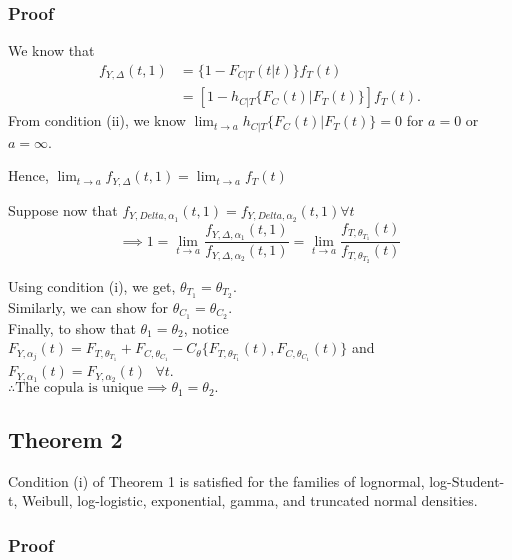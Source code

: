 \subsubsection*{Proof}
We know that 
\begin{align*}
	f_{Y, \Delta} (t,1) &= \{1-F_{C|T} (t|t)\}f_T(t) \\
						&= [1-h_{C|T} \{F_C(t)|F_T(t)\}]f_T(t).
\end{align*}
From condition (ii), we know \( \lim_{t \to a} h_{C|T} \{F_C(t)|F_T(t)\} = 0 \) for \(a=0\) or \(a=\infty \).

Hence, \( \lim_{t \to a} f_{Y, \Delta}(t,1) = \lim_{t \to a} f_T(t) \)

Suppose now that \( f_{Y, Delta, \alpha_1} (t,1) = f_{Y, Delta, \alpha_2} (t,1) \forall t \)
\[
 \implies 1 = \lim_{t \to a} \frac{f_{Y, \Delta, \alpha_1} (t, 1)}{f_{Y, \Delta, \alpha_2} (t,1)} = \lim_{t \to a} \frac{f_{T, \theta_{T_1}} (t)}{f_{T, \theta_{T_2}} (t)}
 \]
 
 Using condition (i), we get, \( \theta_{T_1} = \theta_{T_2}\).\\
 Similarly, we can show for \( \theta_{C_1} = \theta_{C_2}\).\\
 Finally, to show that \( \theta_1 = \theta_2 \), notice \\
 \( F_{Y, \alpha_j} (t) = F_{T, \theta_{T_1}} + F_{C, \theta_{C_1}} - C_\theta \{F_{T, \theta_{T_1}}(t), F_{C, \theta_{C_1}}(t) \}
 \) and \( F_{Y, \alpha_1}(t) = F_{Y, \alpha_2}(t) \text{ } \forall t \).\\
\(\therefore \text{The copula is unique} \implies \theta_1 = \theta_2 .\)

\subsection*{Theorem 2}
Condition (i) of Theorem 1 is satisfied for the families of lognormal, log-Student-t, Weibull, log-logistic, exponential, gamma, and truncated normal densities.

\subsubsection*{Proof}

